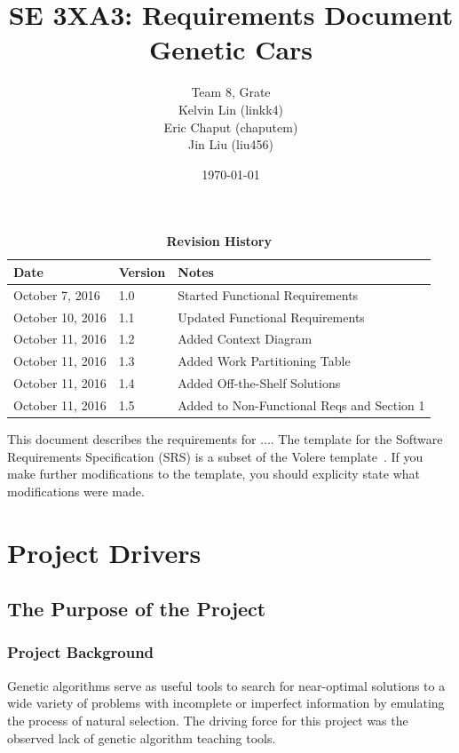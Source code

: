 \documentclass[12pt, titlepage]{article}
\title{SE 3XA3: Requirements Document\\Genetic Cars}
\author{Team 8, Grate
		\\ Kelvin Lin (linkk4)
		\\ Eric Chaput (chaputem)
		\\ Jin Liu (liu456)
}
\date{\today}
\begin{document}
\maketitle

\tableofcontents
\listoftables
\listoffigures

\begin{table}[h]
\caption{\bf Revision History}
\begin{tabularx}{\textwidth}{p{3.5cm}p{2cm}X}
\toprule {\bf Date} & {\bf Version} & {\bf Notes}\\
\midrule
October 7, 2016 & 1.0 & Started Functional Requirements\\
October 10, 2016 & 1.1 & Updated Functional Requirements\\
October 11, 2016 & 1.2 & Added Context Diagram\\
October 11, 2016 & 1.3 & Added Work Partitioning Table\\
October 11, 2016 & 1.4 & Added Off-the-Shelf Solutions\\
October 11, 2016 & 1.5 & Added to Non-Functional Reqs and Section 1\\
\bottomrule
\end{tabularx}
\end{table}

\newpage


This document describes the requirements for ....  The template for the Software
Requirements Specification (SRS) is a subset of the Volere
template~\citep{RobertsonAndRobertson2012}.  If you make further modifications
to the template, you should explicity state what modifications were made.

\section{Project Drivers}

\subsection{The Purpose of the Project}

\subsubsection{Project Background}

Genetic algorithms serve as useful tools to search for near-optimal solutions to a wide variety of problems with incomplete or imperfect information by emulating the process of natural selection. The driving force for this project was the observed lack of genetic algorithm teaching tools. 
\end{document}
